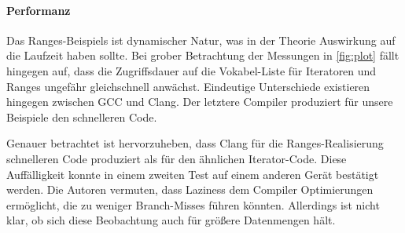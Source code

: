 \documentclass[runningheads]{llncs}
\begin{document}
\paragraph{Performanz}

Das Ranges-Beispiels ist dynamischer Natur, was in der Theorie Auswirkung auf die Laufzeit haben sollte.
Bei grober Betrachtung der Messungen in \autoref{fig:plot} fällt hingegen auf, dass die Zugriffsdauer auf die Vokabel-Liste für Iteratoren und Ranges ungefähr gleichschnell anwächst.
Eindeutige Unterschiede existieren hingegen zwischen GCC und Clang.
Der letztere Compiler produziert für unsere Beispiele den schnelleren Code.

Genauer betrachtet ist hervorzuheben, dass Clang für die Ranges-Realisierung schnelleren Code produziert als für den ähnlichen Iterator-Code.
Diese Auffälligkeit konnte in einem zweiten Test auf einem anderen Gerät bestätigt werden.
Die Autoren vermuten, dass Laziness dem Compiler Optimierungen ermöglicht, die zu weniger Branch-Misses führen könnten.
Allerdings ist nicht klar, ob sich diese Beobachtung auch für größere Datenmengen hält.
\end{document}
